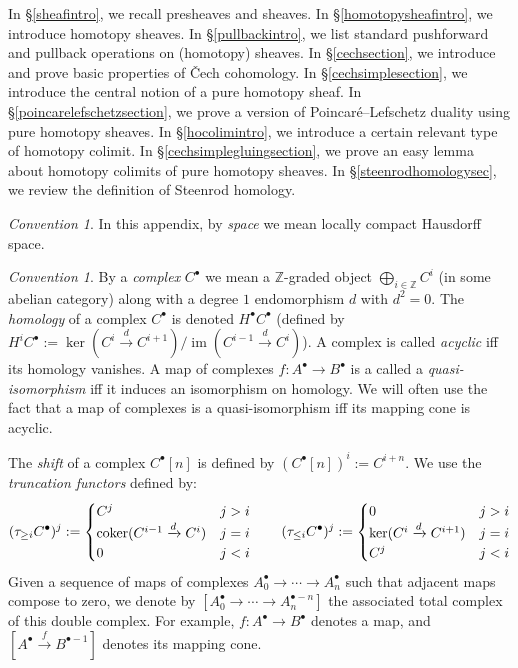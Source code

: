\documentclass[12pt]{article}
\theoremstyle{definition}
\theoremstyle{remark}
\newtheorem{convention}[theorem]{Convention}
\numberwithin{equation}{subsection}
\newcommand{\ZZ}{\mathbb Z}
\newcommand{\coker}{\operatorname{coker}}
\newcommand{\im}{\operatorname{im}}
\begin{document}
In \S\ref{sheafintro}, we recall presheaves and sheaves.  In \S\ref{homotopysheafintro}, we introduce homotopy sheaves.  In \S\ref{pullbackintro}, we list standard pushforward and pullback operations on (homotopy) sheaves.  In \S\ref{cechsection}, we introduce and prove basic properties of \v Cech cohomology.  In \S\ref{cechsimplesection}, we introduce the central notion of a pure homotopy sheaf.  In \S\ref{poincarelefschetzsection}, we prove a version of Poincar\'e--Lefschetz duality using pure homotopy sheaves.  In \S\ref{hocolimintro}, we introduce a certain relevant type of homotopy colimit.  In \S\ref{cechsimplegluingsection}, we prove an easy lemma about homotopy colimits of pure homotopy sheaves.  In \S\ref{steenrodhomologysec}, we review the definition of Steenrod homology.

\begin{convention}
In this appendix, by \emph{space} we mean locally compact Hausdorff space.
\end{convention}

\begin{convention}\label{complexconventions}
By a \emph{complex} $C^\bullet$ we mean a $\ZZ$-graded object $\bigoplus_{i\in\ZZ}C^i$ (in some abelian category) along with a degree $1$ endomorphism $d$ with $d^2=0$.  The \emph{homology} of a complex $C^\bullet$ is denoted $H^\bullet C^\bullet$ (defined by $H^iC^\bullet:=\ker(C^i\xrightarrow dC^{i+1})/\im(C^{i-1}\xrightarrow dC^i)$).  A complex is called \emph{acyclic} iff its homology vanishes.  A map of complexes $f:A^\bullet\to B^\bullet$ is a called a \emph{quasi-isomorphism} iff it induces an isomorphism on homology.  We will often use the fact that a map of complexes is a quasi-isomorphism iff its mapping cone is acyclic.

The \emph{shift} of a complex $C^\bullet[n]$ is defined by $(C^\bullet[n])^i:=C^{i+n}$.  We use the \emph{truncation functors} defined by:
\begin{equation*}
(\tau_{\geq i}C^\bullet)^j:=\begin{cases}C^j&j>i\cr\coker(C^{i-1}\xrightarrow dC^i)&j=i\cr 0&j<i\end{cases}\qquad
(\tau_{\leq i}C^\bullet)^j:=\begin{cases}0&j>i\cr\ker(C^i\xrightarrow dC^{i+1})&j=i\cr C^j&j<i\end{cases}
\end{equation*}
Given a sequence of maps of complexes $A_0^\bullet\to\cdots\to A_n^\bullet$ such that adjacent maps compose to zero, we denote by $[A_0^\bullet\to\cdots\to A_n^{\bullet-n}]$ the associated total complex of this double complex.  For example, $f:A^\bullet\to B^\bullet$ denotes a map, and $[A^\bullet\xrightarrow fB^{\bullet-1}]$ denotes its mapping cone.
\end{convention}
\end{document}
